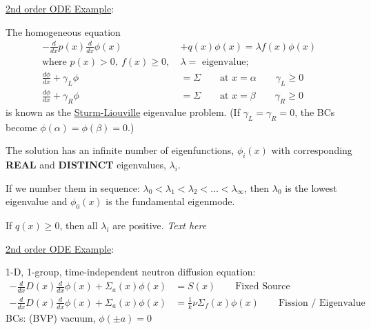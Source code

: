 \documentclass[12pt]{exam}
\newcommand{\Macro}{\ensuremath{\Sigma}}
\begin{document}
\vspace*{1em}
\underline{2nd order ODE Example}:

The homogeneous equation %
%
\begin{align}
-\frac{d}{dx}p(x) \frac{d}{dx}\phi(x) &+ q(x)\phi(x) = \lambda f(x) \phi(x) \nonumber \\
\text{where }p(x) > 0, \:f(x) \geq 0,\: &\lambda = \text{ eigenvalue;}\nonumber \\
\frac{d\phi}{dx} + \gamma_L \phi &= \Macro \qquad \text{at }x=\alpha \qquad \gamma_L \geq 0  \nonumber \\
\frac{d\phi}{dx} + \gamma_R \phi &= \Macro \qquad \text{at }x=\beta \qquad \gamma_R \geq 0\nonumber 
\end{align}
%
is known as the \underline{Sturm-Liouville} eigenvalue problem. (If $\gamma_L = \gamma_R = 0$, the BCs become $\phi(\alpha) = \phi(\beta) = 0$.)

The solution has an infinite number of eigenfunctions, $\phi_i(x)$ with corresponding \textbf{REAL} and \textbf{DISTINCT} eigenvalues, $\lambda_i$. 

\ifprintanswers
If we number them in sequence: $\lambda_0 < \lambda_1 < \lambda_2 < \dots < \lambda_{\infty}$, then $\lambda_0$ is the lowest eigenvalue and $\phi_0(x)$ is the fundamental eigenmode. 

If $q(x) \geq 0$, then all $\lambda_i$ are positive.
\else
 \vspace*{1em} \hspace*{8em} \textit{Text here} 
\fi

\vspace*{1em}
\underline{2nd order ODE Example}:

1-D, 1-group, time-independent neutron diffusion equation:
%
\begin{align}
-\frac{d}{dx}D(x)\frac{d}{dx}\phi(x) + \Macro_a(x)\phi(x) &= S(x) \qquad \text{Fixed Source} \nonumber \\
-\frac{d}{dx}D(x)\frac{d}{dx}\phi(x) + \Macro_a(x)\phi(x) &= \frac{1}{k} \nu \Macro_f(x) \phi(x)\qquad \text{Fission / Eigenvalue} \nonumber
\end{align}
%
BCs: (BVP) vacuum, $\phi(\pm a) = 0$
\end{document}
